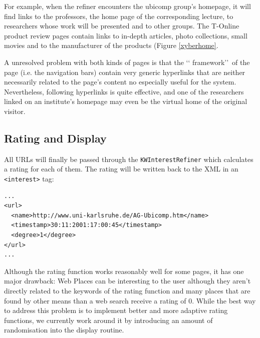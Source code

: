 \documentclass[a4paper]{danarticle}
\theoremstyle{remark}
\begin{document}
      For example, when the refiner encounters the ubicomp group's homepage, it
      will find links to the professors, the home page of the corresponding
      lecture, to researchers whose work will be presented and to other groups.
      The T-Online product review pages contain links to in-depth articles,
      photo collections, small movies and to the manufacturer of the products
      (Figure \ref{xyberhome}.
      
      A unresolved problem with both kinds of pages is that the \lq\lq
      framework\rq\rq\ of the page (i.e. the navigation bars) contain very
      generic hyperlinks that are neither necessarily related to the page's content
      no especially useful for the system.
      Nevertheless, following hyperlinks is quite effective, and one of the
      researchers linked on an institute's homepage may even be the virtual home
      of the original visitor.
    \subsection{Rating and Display}
      All URLs will finally be passed through the \verb$KWInterestRefiner$
      which
      calculates a rating for each of them. The rating will be written back
      to the XML in an \verb$<interest>$ tag:
      
      \begin{verbatim}
...
<url>
  <name>http://www.uni-karlsruhe.de/AG-Ubicomp.htm</name> 
  <timestamp>30:11:2001:17:00:45</timestamp> 
  <degree>1</degree> 
</url>
...
      \end{verbatim}
      
      Although the rating function works reasonably well for some pages, it has
      one major drawback: Web Places can be interesting to the user although
      they aren't directly related to the keywords of the rating function and
      many places that are found by other means than a web search receive
      a rating of 0. While the best way to address this problem is to implement
      better and more adaptive rating functions, we currently work around it by
      introducing an amount of randomisation into the display routine. 
 
\end{document}
